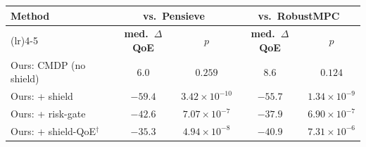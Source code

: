 \begin{tabularx}{\linewidth}{@{}>{\raggedright\arraybackslash}Xcccc@{}}
\toprule
\textbf{Method} & \multicolumn{2}{c}{\textbf{vs.\ Pensieve}} & \multicolumn{2}{c}{\textbf{vs.\ RobustMPC}} \\
\cmidrule(lr){2-3}\cmidrule(lr){4-5}
 & \textbf{med.\ $\Delta$QoE} & \textbf{$p$} & \textbf{med.\ $\Delta$QoE} & \textbf{$p$} \\
\midrule
Ours: CMDP (no shield) & $6.0$ & $0.259$ & $8.6$ & $0.124$ \\
Ours: + shield & $-59.4$ & $3.42\times10^{-10}$ & $-55.7$ & $1.34\times10^{-9}$ \\
Ours: + risk-gate & $-42.6$ & $7.07\times10^{-7}$ & $-37.9$ & $6.90\times10^{-7}$ \\
Ours: + shield-QoE$^{\dagger}$ & $-35.3$ & $4.94\times10^{-8}$ & $-40.9$ & $7.31\times10^{-6}$ \\
\bottomrule
\end{tabularx}
